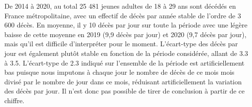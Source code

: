 \documentclass[titlepage]{article}
\begin{document}
De 2014 à 2020, au total 25 481 jeunes adultes de 18 à 29 ans sont décédés en France métropolitaine, avec un effectif de décès par année stable de l'ordre de 3 600 décès. En moyenne, il y 10 décès par jour sur toute la période avec une légère baisse de cette moyenne en 2019 (9,9 décès par jour) et 2020 (9,7 décès par jour), mais qu'il est difficile d'interpréter pour le moment. L'écart-type des décès par jour est également plutôt stable en fonction de la période considérée, allant de 3.3 à 3.5. L'écart-type de 2.3 indiqué sur l'ensemble de la période est artificiellement bas puisque nous imputons à chaque jour le nombre de décès de ce mois mois divisé par le nombre de jour dans ce mois, réduisant artificiellement la variation des décès par jour. Il n'est donc pas possible de tirer de conclusion à partir de ce chiffre. \\
\end{document}
